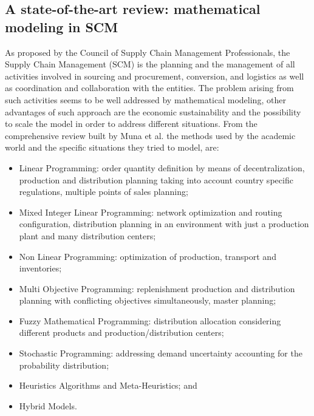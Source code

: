 \begin{doublespace}
\section{A state-of-the-art review: mathematical modeling in SCM}
  As proposed by the Council of Supply Chain Management Professionals, the Supply Chain Management (SCM) is the planning and the management of all activities involved in sourcing and procurement, conversion, and logistics as well as coordination and collaboration with the entities. The problem arising from such activities seems to be well addressed by mathematical modeling, other advantages of such approach are the economic sustainability and the possibility to scale the model in order to address different situations.
  From the comprehensive review built by Muna et al. \cite{Mula2010} the methods used by the academic world and the specific situations they tried to model, are:
  \begin{itemize}
	  \item Linear Programming: order quantity definition by means of decentralization\cite{Jung2008}, production and distribution planning taking into account country specific regulations\cite{Oh2006}, multiple points of sales planning\cite{Kanyalkar2005};
	  \item Mixed Integer Linear Programming: network optimization and routing configuration\cite{Romo2009}, distribution planning in an environment with just a production plant and many distribution centers\cite{Rizk2008};
    \item Non Linear Programming: optimization of production, transport and inventories\cite{Benjamin1989};
    \item Multi Objective Programming: replenishment production and distribution planning with conflicting objectives simultaneously\cite{Torabi2008}, master planning\cite{Chern2007};
    \item Fuzzy Mathematical Programming: distribution allocation considering different products and production/distribution centers\cite{Liang2009};
    \item Stochastic Programming: addressing demand uncertainty accounting for the probability distribution\cite{Gupta2003};
    \item Heuristics Algorithms and Meta-Heuristics; and
    \item Hybrid Models.
  \end{itemize}


\end{doublespace}
